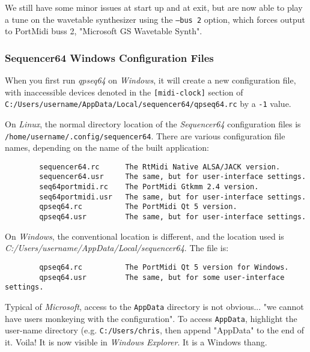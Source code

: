     We still have some minor issues at start up and at exit, but are now able
    to play a tune on the wavetable synthesizer using the
    \texttt{--bus 2} option, which forces output to PortMidi buss 2,
    "Microsoft GS Wavetable Synth".

\subsubsection{Sequencer64 Windows Configuration Files}
\label{subsubsec:qt_portmidi_windows_setup_config}

    When you first run \textsl{qpseq64}
    on \textsl{Windows}, it will create a new configuration
    file, with inaccessible devices denoted in the
    \texttt{[midi-clock]} section of
    \texttt{C:/Users/username/AppData/Local/sequencer64/qpseq64.rc}
    by a \texttt{-1} value.

    On \textsl{Linux},
    the normal directory location of the \textsl{Sequencer64} configuration
    files is
    \texttt{/home/username/.config/sequencer64}.  There are various
    configuration file names, depending on the name of the built application:

\begin{verbatim}
        sequencer64.rc      The RtMidi Native ALSA/JACK version.
        sequencer64.usr     The same, but for user-interface settings.
        seq64portmidi.rc    The PortMidi Gtkmm 2.4 version.
        seq64portmidi.usr   The same, but for user-interface settings.
        qpseq64.rc          The PortMidi Qt 5 version.
        qpseq64.usr         The same, but for user-interface settings.
\end{verbatim}

    On \textsl{Windows},
    the conventional location is different, and the location used
    is \textsl{C:/Users/username/AppData/Local/sequencer64}.
    The file is:

\begin{verbatim}
        qpseq64.rc          The PortMidi Qt 5 version for Windows.
        qpseq64.usr         The same, but for some user-interface settings.
\end{verbatim}

    Typical of \textsl{Microsoft}, access to the \texttt{AppData} directory
    is not obvious... "we cannot have users monkeying with the configuration".
    To access \texttt{AppData}, highlight the user-name directory
    (e.g. \texttt{C:/Users/chris}, then append
    "AppData" to the end of it.  Voila! It is now visible in
    \textsl{Windows Explorer}.
    It is a Windows thang.

